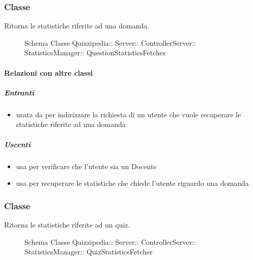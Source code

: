 \subsubsection{Classe }
Ritorna le statistiche riferite ad una domanda.
\begin{figure}[H]
\centering
\noindent{}
\caption[Schema Classe QuestionStatisticsFetcher]{Schema Classe Quizzipedia:: Server:: ControllerServer:: StatisticsManager:: QuestionStatisticsFetcher}
\end{figure}
\paragraph{Relazioni con altre classi}
\subparagraph{Entranti}
\begin{itemize}
\item usata da  per indirizzare la richiesta di un utente che vuole recuperare le statistiche riferite ad una domanda
\end{itemize}
\subparagraph{Uscenti}
\begin{itemize}
\item usa  per verificare che l'utente sia un Docente
\item usa  per recuperare le statistiche che chiede l'utente riguardo una domanda
\end{itemize}
\subsubsection{Classe }
Ritorna le statistiche riferite ad un quiz.
\begin{figure}[H]
\centering
\noindent{}
\caption[Schema Classe QuizStatisticsFetcher]{Schema Classe Quizzipedia:: Server:: ControllerServer:: StatisticsManager:: QuizStatisticsFetcher}
\end{figure}
